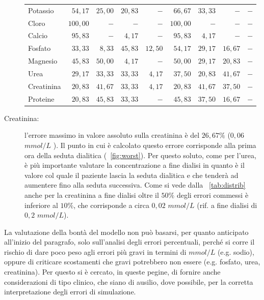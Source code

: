 \begin{description}
\begin{table}[!t]
\begin{tabular}{lrrrrrrrr}
  	Potassio       & $54,17$  & $25,00$ & $20,83$ & $-$     & $66,67$  & $33,33$ & $-$     & $-$ \\
  	Cloro          & $100,00$ & $-$     & $-$     & $-$     & $100,00$ & $-$     & $-$     & $-$ \\
  	Calcio         & $95,83$  & $-$     & $4,17$  & $-$     & $95,83$  & $4,17$  & $-$     & $-$ \\
  	Fosfato        & $33,33$  & $8,33$  & $45,83$ & $12,50$ & $54,17$  & $29,17$ & $16,67$ & $-$ \\
  	Magnesio       & $45,83$  & $50,00$ & $4,17$  & $-$     & $50,00$  & $29,17$ & $20,83$ & $-$ \\
  	Urea           & $29,17$  & $33,33$ & $33,33$ & $4,17$  & $37,50$  & $20,83$ & $41,67$ & $-$ \\
  	Creatinina     & $20,83$  & $41,67$ & $33,33$ & $4,17$  & $20,83$  & $41,67$ & $37,50$ & $-$ \\
  	Proteine       & $20,83$  & $45,83$ & $33,33$ & $-$     & $45,83$  & $37,50$ & $16,67$ & $-$ \\
\bottomrule
\end{tabular}
\end{table}
	\item[Creatinina:] l'errore massimo in valore assoluto sulla creatinina è del $26,67\%$ ($0,06$ $mmol/L$ ). Il punto in cui è calcolato questo errore corrisponde alla prima ora della seduta dialitica (\figurename~\ref{fig:worst}). Per questo soluto, come per l'urea, è più importante valutare la concentrazione a fine dialisi in quanto è il valore col quale il paziente lascia la seduta dialitica e che tenderà ad aumentere fino alla seduta successiva. Come si vede dalla \tablename~\ref{tab:distrib} anche per la creatinina a fine dialisi oltre il $50\%$ degli errori commessi è inferiore al $10\%$, che corrisponde a circa $0,02$ $mmol/L$ (rif. a fine dialisi di $0,2$ $mmol/L$).
\end{description}

La valutazione della bontà del modello non può basarsi, per quanto anticipato all'inizio del paragrafo,  solo sull'analisi degli errori percentuali, perché si corre il rischio di dare poco peso agli errori più gravi in termini di $mmol/L$ (e.g. sodio), oppure di criticare scostamenti che gravi potrebbero non essere (e.g. fosfato, urea, creatinina). Per questo si è cercato, in queste pegine, di fornire anche considerazioni di tipo clinico, che siano di ausilio, dove possibile, per la corretta interpretazione degli errori di simulazione.
